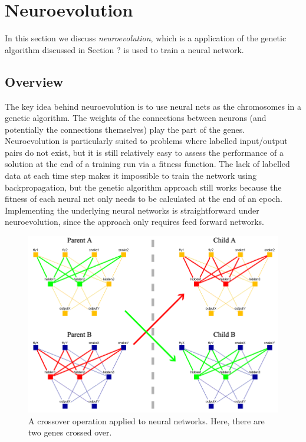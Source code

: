 \clearpage
\section{Neuroevolution}

In this section we discuss \textit{neuroevolution}, which is a application of the genetic algorithm discussed in Section ? is used to train a neural network.

\subsection{Overview}

The key idea behind neuroevolution is to use neural nets as the chromosomes in a genetic algorithm. The weights of the connections between neurons (and potentially the connections themselves) play the part of the genes. Neuroevolution is particularly suited to problems where labelled input/output pairs do not exist, but it is still relatively easy to assess the performance of a solution at the end of a training run via a fitness function. The lack of labelled data at each time step makes it impossible to train the network using backpropagation, but the genetic algorithm approach still works because the fitness of each neural net only needs to be calculated at the end of an epoch. Implementing the underlying neural networks is straightforward under neuroevolution, since the approach only requires feed forward networks.

\begin{figure}[!htbp]
    \centering
    \includegraphics[scale=0.6]{Figs/Crossover.png}
    \caption{A crossover operation applied to neural networks. Here, there are two genes crossed over.}
    \label{fig:netCrossover}
\end{figure}

